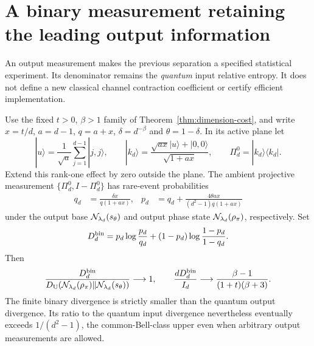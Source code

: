 \section{A binary measurement retaining the leading output information}\label{sec:binary}
An output measurement makes the previous separation a specified statistical experiment. Its denominator remains the \emph{quantum} input relative entropy. It does not define a new classical channel contraction coefficient or certify efficient implementation.

\begin{theorem}\label{thm:binary}
Use the fixed $t>0$, $\beta>1$ family of Theorem~\ref{thm:dimension-cost}, and write $x=t/d$, $a=d-1$, $q=a+x$, $\delta=d^{-\beta}$ and $\theta=1-\delta$. In its active plane let
\[
 |u\rangle=\frac1{\sqrt a}\sum_{j=1}^{d-1}|j,j\rangle,
 \qquad |k_d\rangle=
 \frac{\sqrt{ax}|u\rangle+|0,0\rangle}{\sqrt{1+ax}},
 \qquad \Pi_d^0=|k_d\rangle\langle k_d|.
\]
Extend this rank-one effect by zero outside the plane. The ambient projective measurement $\{\Pi_d^0,I-\Pi_d^0\}$ has rare-event probabilities
\begin{align}
 q_d&=\frac{\delta x}{q(1+ax)},&
 p_d&=q_d+\frac{4\theta ax}{(d^2-1)q(1+ax)}\label{eq:binary-probs}
\end{align}
under the output base $\mathcal N_{\lambda_d}(s_\theta)$ and output phase state $\mathcal N_{\lambda_d}(\rho_\pi)$, respectively. Set
\[
 D_d^{\rm bin}=p_d\log\frac{p_d}{q_d}
 +(1-p_d)\log\frac{1-p_d}{1-q_d}.
\]
Then
\[
 \frac{D_d^{\rm bin}}{D_{\mathrm U}(\mathcal N_{\lambda_d}(\rho_\pi)
                      \Vert\mathcal N_{\lambda_d}(s_\theta))}\longrightarrow1,
 \qquad \frac{dD_d^{\rm bin}}{I_d}\longrightarrow
       \frac{\beta-1}{(1+t)(\beta+3)}.
\]
The finite binary divergence is strictly smaller than the quantum output divergence. Its ratio to the quantum input divergence nevertheless eventually exceeds $1/(d^2-1)$, the common-Bell-class upper even when arbitrary output measurements are allowed.
\end{theorem}
